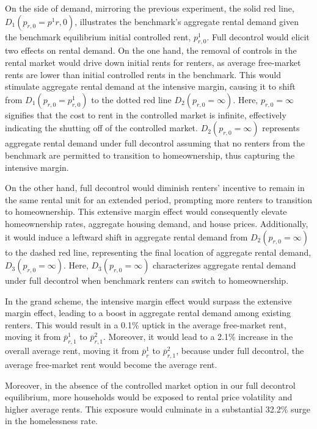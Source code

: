 \documentclass[parskip=full]{article}
\begin{document}
On the side of demand, mirroring the previous experiment, the solid red line, $D_{1}(p_{r,0}=p^{1}{r,0})$, illustrates the benchmark's aggregate rental demand given the benchmark equilibrium initial controlled rent, $p^{1}_{r,0}$. Full decontrol would elicit two effects on rental demand. On the one hand, the removal of controls in the rental market would drive down initial rents for renters, as average free-market rents are lower than initial controlled rents in the benchmark. This would stimulate aggregate rental demand at the intensive margin, causing it to shift from $D_{1}(p_{r,0}=p^{1}_{r,0})$ to the dotted red line $D_{2}(p_{r,0}=\infty)$. Here, $p_{r,0}=\infty$ signifies that the cost to rent in the controlled market is infinite, effectively indicating the shutting off of the controlled market. $D_{2}(p_{r,0}=\infty)$ represents aggregate rental demand under full decontrol assuming that no renters from the benchmark are permitted to transition to homeownership, thus capturing the intensive margin.

On the other hand, full decontrol would diminish renters' incentive to remain in the same rental unit for an extended period, prompting more renters to transition to homeownership. This extensive margin effect would consequently elevate homeownership rates, aggregate housing demand, and house prices. Additionally, it would induce a leftward shift in aggregate rental demand from $D_{2}(p_{r,0}=\infty)$ to the dashed red line, representing the final location of aggregate rental demand, $D_{3}(p_{r,0}=\infty)$. Here, $D_{3}(p_{r,0}=\infty)$ characterizes aggregate rental demand under full decontrol when benchmark renters can switch to homeownership.

In the grand scheme, the intensive margin effect would surpass the extensive margin effect, leading to a boost in aggregate rental demand among existing renters. This would result in a 0.1\% uptick in the average free-market rent, moving it from $\overline{p}^{1}_{r,1}$ to $\overline{p}^{2}_{r,1}$. Moreover, it would lead to a 2.1\% increase in the overall average rent, moving it from $\overline{p}^{1}_{r}$ to $\overline{p}^{2}_{r,1}$, because under full decontrol, the average free-market rent would become the average rent.

Moreover, in the absence of the controlled market option in our full decontrol equilibrium, more households would be exposed to rental price volatility and higher average rents. This exposure would culminate in a substantial 32.2\% surge in the homelessness rate.
\end{document}
